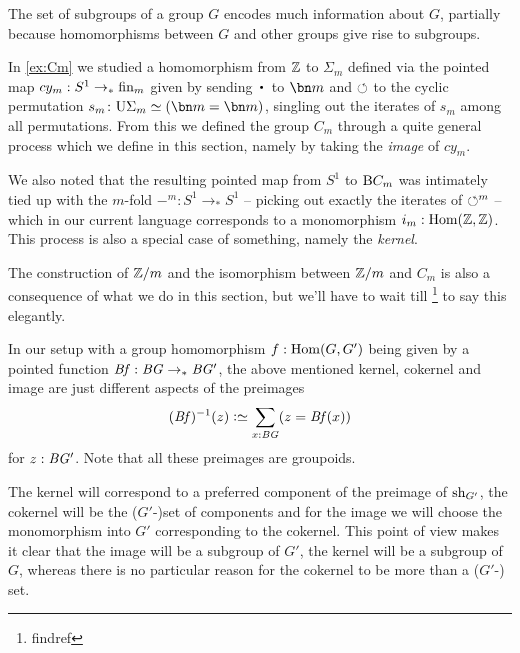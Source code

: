 The set of subgroups of a group $G$ encodes much information about $G$, partially because homomorphisms between $G$ and other groups give rise to subgroups.

In \cref{ex:Cm} we studied a homomorphism from $\mathbb{Z}$ to $\Sigma_m$ defined via the pointed map $cy_m:S^1\to_*\fin_m$ given by sending $\base$ to $\bn m$ and
$\circlearrowleft$ to the cyclic permutation $s_m\colon\USym\Sigma_m\oldequiv(\bn m=\bn m)$, singling out the iterates of $s_m$ among all permutations.  From this we defined the group $C_m$ through a quite general process which we define in this section, namely by taking the \emph{image} of $cy_m$.

We also noted that the resulting pointed map from $S^1$ to $\mathrm{B} C_m$ was intimately tied up with the $m$-fold \covering $-^m:S^1\to_*S^1$ -- picking out exactly the iterates of $\circlearrowleft^m$ -- which in our current language corresponds to a monomorphism $i_m:\Hom(\ZZ,\ZZ)$. This process is also a special case of something, namely the \emph{kernel}.

The construction of $\mathbb{Z}/m$ and the isomorphism between $\mathbb{Z}/m$ and $C_m$ is also a consequence of what we do in this section, but we'll have to wait till \footnote{findref} to say this elegantly.




In our setup with a group homomorphism
$f:\Hom(G,G')$ being given by a pointed function $\mathit{B}\mathit{f}:\mathit{B}\mathit{G}\to_*\mathit{B}\mathit{G}'$, the above mentioned kernel, cokernel and image are just different aspects of the preimages
$$(\Bf)^{-1}(z)\defequi\sum_{x:\BG}(z=\Bf(x))$$
for $z:\mathit{B}\mathit{G}'$.  Note that all these preimages are groupoids.

The kernel will correspond to a preferred component of the preimage of $\mathrm{sh}_{G'}$, the cokernel will be the ($G'$-)set of components and for the image we will choose the monomorphism into $G'$ corresponding to the cokernel.  This point of view makes it clear that the image will be a subgroup of $G'$, the kernel will be a subgroup of $G$, whereas there is no particular reason for the cokernel to be more than a ($G'$-) set.

